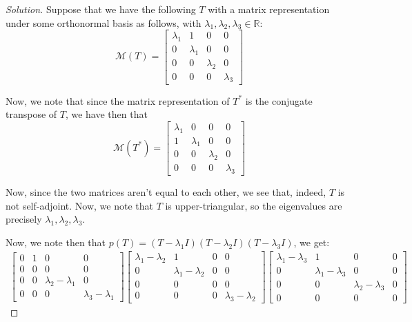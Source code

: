 \documentclass{article}
\newenvironment{solution}{\begin{proof}[Solution]}{\end{proof}}
\newcommand{\RR}{\mathbb{R}}
\begin{document}
\begin{solution}
	Suppose that we have the following $T$ with a matrix representation under some orthonormal basis as follows, with $\lambda_1, \lambda_2, \lambda_3 \in \RR$:
	\begin{equation*}
		\mathcal{M}(T) = \begin{bmatrix}
			\lambda_1 & 1 & 0 & 0 \\
			0 & \lambda_1 & 0 & 0 \\
			0 & 0 & \lambda_2 & 0 \\
			0 & 0 & 0 & \lambda_3
		\end{bmatrix}
	\end{equation*}

	Now, we note that since the matrix representation of $T^{*}$ is the conjugate transpose of $T$, we have then that
	\begin{equation*}
		\mathcal{M}(T^{*}) = \begin{bmatrix}
			\lambda_{1} & 0 & 0 & 0 \\
			1 & \lambda_{1} & 0 & 0 \\
			0 & 0 & \lambda_2 & 0 \\
			0 & 0 & 0 & \lambda_3
		\end{bmatrix}
	\end{equation*}

	Now, since the two matrices aren't equal to each other, we see that, indeed, $T$ is not self-adjoint. Now, we note that $T$ is upper-triangular, so the eigenvalues are precisely $\lambda_1, \lambda_2, \lambda_3$.
	
	Now, we note then that $p(T) = (T - \lambda_1 I)(T-\lambda_2 I)(T-\lambda_3 I)$, we get:
	\begin{align*}
		\begin{bmatrix}
			0 & 1 & 0 & 0 \\ 0 & 0 & 0 & 0 \\ 0 & 0 & \lambda_2 - \lambda_1 & 0 \\ 0 & 0 & 0 & \lambda_3 - \lambda_1
		\end{bmatrix}
	\begin{bmatrix}
		\lambda_1 - \lambda_2 & 1 & 0 & 0 \\ 0 & \lambda_1-\lambda_2 & 0 & 0 \\ 0 & 0 & 0 & 0 \\ 0 & 0 & 0 & \lambda_3 - \lambda_2
	\end{bmatrix}
\begin{bmatrix}
	\lambda_1 - \lambda_3 & 1 & 0 & 0 \\ 0 & \lambda_1 - \lambda_3& 0 & 0 \\ 0 & 0 & \lambda_2-\lambda_3 & 0 \\ 0 & 0 & 0 & 0
\end{bmatrix}
	\end{align*}


\end{solution}
\end{document}

